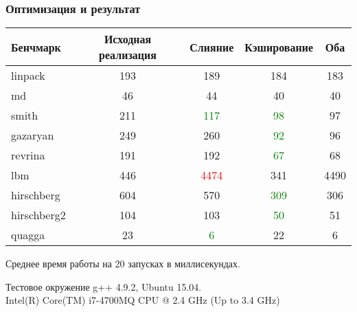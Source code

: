 \documentclass[utf8,russian]{beamer}
\begin{document}
\begin{frame}
\frametitle{Оптимизация и результат}

\begin{block}{}

\begin{table}
\begin{tabular}{l | c | c | c | c }
Бенчмарк & Исходная реализация & Слияние & Кэширование & Оба \\
\hline \hline
linpack     & 193 & 189                    & 184                    & 183 \\
md          & 46  & 44                     & 40                     & 40\\ 
smith       & 211 & \textcolor{green}{117} & \textcolor{green}{98}  & 97\\
gazaryan    & 249 & 260                    & \textcolor{green}{92}  & 96\\
revrina     & 191 & 192                    & \textcolor{green}{67}  & 68\\
lbm         & 446 & \textcolor{red}{4474}  & 341                    & 4490\\
hirschberg  & 604 & 570                    & \textcolor{green}{309} & 306\\
hirschberg2 & 104 & 103                    & \textcolor{green}{50}  & 51\\
quagga      & 23  & \textcolor{green}{6}   & 22                     & 6
\end{tabular}
\end{table}
Среднее время работы на 20 запусках в миллисекундах.
\end{block}

\begin{block}{Тестовое окружение}
g++ 4.9.2, Ubuntu 15.04.\\
Intel(R) Core(TM) i7-4700MQ CPU @ 2.4 GHz (Up to 3.4 GHz)
\end{block}

\end{frame}

\end{document}
